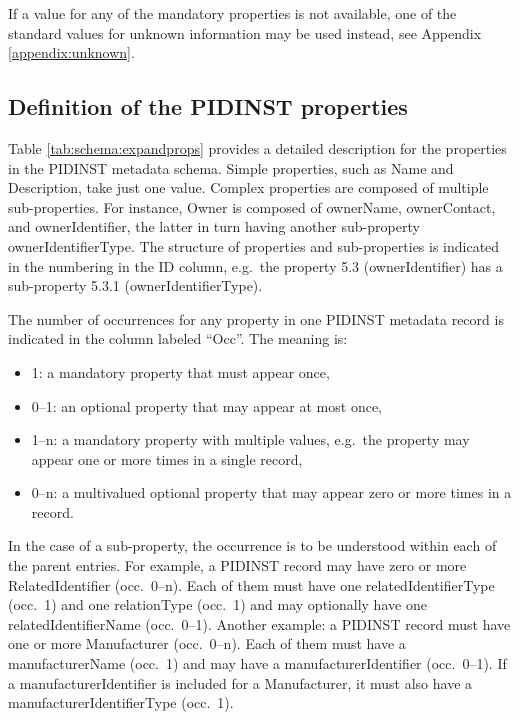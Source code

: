 \documentclass[titlepage=true,twoside=false,DIV=13]{scrartcl}
\begin{document}
If a value for any of the mandatory properties is not available, one
of the standard values for unknown information may be used instead,
see Appendix \ref{appendix:unknown}.

\subsection{Definition of the PIDINST properties}

Table \ref{tab:schema:expandprops} provides a detailed description for
the properties in the PIDINST metadata schema.  Simple properties,
such as Name and Description, take just one value.  Complex properties
are composed of multiple sub-properties.  For instance, Owner is
composed of ownerName, ownerContact, and ownerIdentifier, the latter
in turn having another sub-property ownerIdentifierType.  The
structure of properties and sub-properties is indicated in the
numbering in the ID column, e.g.\ the property 5.3 (ownerIdentifier)
has a sub-property 5.3.1 (ownerIdentifierType).

The number of occurrences for any property in one PIDINST metadata
record is indicated in the column labeled ``Occ''.  The meaning is:
\begin{itemize}
\item 1: a mandatory property that must appear once,
\item 0--1: an optional property that may appear at most once,
\item 1--n: a mandatory property with multiple values, e.g.\ the
  property may appear one or more times in a single record,
\item 0--n: a multivalued optional property that may appear zero
  or more times in a record.
\end{itemize}
In the case of a sub-property, the occurrence is to be understood
within each of the parent entries.  For example, a PIDINST record may
have zero or more RelatedIdentifier (occ.\ 0--n).  Each of them must
have one relatedIdentifierType (occ.\ 1) and one relationType
(occ.\ 1) and may optionally have one relatedIdentifierName
(occ.\ 0--1).  Another example: a PIDINST record must have one or more
Manufacturer (occ.\ 0--n).  Each of them must have a manufacturerName
(occ.\ 1) and may have a manufacturerIdentifier (occ.\ 0--1).  If a
manufacturerIdentifier is included for a Manufacturer, it must also
have a manufacturerIdentifierType (occ.\ 1).

\newlength{\idcolw}\settowidth{\idcolw}{5.3.1}
\newlength{\propcolw}\settowidth{\propcolw}{instrumentTypeIdentifierType}
\newlength{\occcolw}
\newlength{\valcolw}\settowidth{\valcolw}{Controlled list of values:}
\setlength{\defcolw}{\textwidth}
\addtolength{\defcolw}{-\idcolw}
\addtolength{\defcolw}{-\propcolw}
\addtolength{\defcolw}{-\occcolw}
\addtolength{\defcolw}{-\valcolw}
\addtolength{\defcolw}{-10\tabcolsep}
\end{document}
